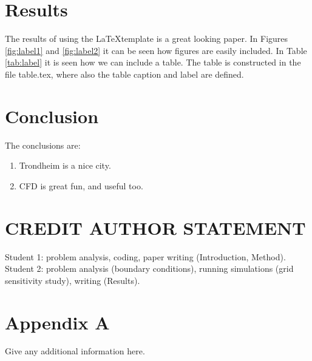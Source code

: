 \documentclass{CFD2017}
\begin{document}
\newpage



\section{Results}
The results of using the \LaTeX template is a great looking paper.
In Figures \ref{fig:label1} and \ref{fig:label2} it can be seen how figures are easily included.
In Table \ref{tab:label} it is seen how we can include a table.
The table is constructed in the file table.tex, where also the table caption and label are defined.


\newpage
{}

\section{Conclusion}
The conclusions are:
\begin{enumerate}
  \item Trondheim is a nice city.
  \item CFD is great fun, and useful too.
\end{enumerate}


\section{CREDIT AUTHOR STATEMENT}

Student 1: problem analysis, coding, paper writing (Introduction, Method).\\
Student 2: problem analysis (boundary conditions), running simulations (grid sensitivity study), writing (Results).






\newpage
\section{Appendix A}
Give any additional information here.
\end{document}
